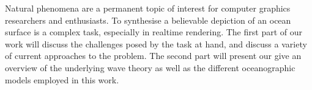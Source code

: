 
Natural phenomena are a permanent topic of interest for computer graphics researchers and enthusiasts. To synthesise a believable
depiction of an ocean surface is a complex task, especially in realtime rendering. The first part of our work will discuss the
challenges posed by the task at hand, and discuss a variety of current approaches to the problem. The second part will present
our give an
overview of the underlying wave theory as well as the different oceanographic models employed in this work.